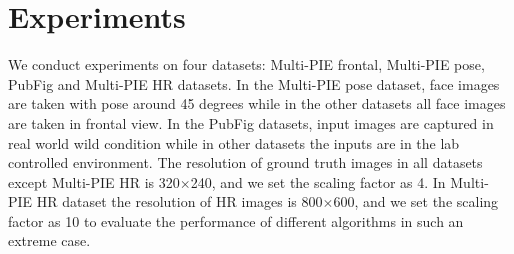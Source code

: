 \documentclass{article}
\begin{document}
\section{Experiments}

We conduct experiments on four datasets: Multi-PIE \cite{gross-ivc10-multiPie} frontal, Multi-PIE pose, PubFig \cite{kumar-iccv09-pubFig} and Multi-PIE HR datasets. In the Multi-PIE pose dataset, face images are taken with pose around 45 degrees while in the other datasets all face images are taken in frontal view. In the PubFig datasets, input images are captured in real world wild condition while in other datasets the inputs are in the lab controlled environment. The resolution of ground truth images in all datasets except Multi-PIE HR is 320$\times$240, and we set the scaling factor as 4. In Multi-PIE HR dataset the resolution of HR images is 800$\times$600, and we set the scaling factor as 10 to evaluate the performance of different algorithms in such an extreme case.
\end{document}
